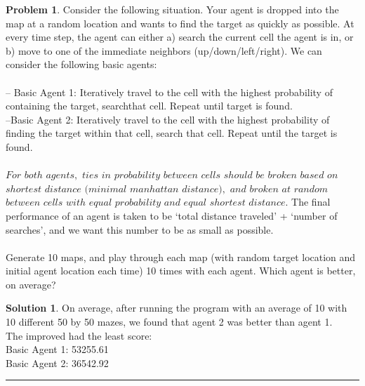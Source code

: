 \documentclass{article}
\theoremstyle{definition}
\newtheorem{problem}{Problem}
\def\fline{\rule{0.75\linewidth}{0.5pt}}
\newcommand{\finishline}{\vspace{-15pt}\begin{center}\fline\end{center}}
\newtheorem*{solution*}{Solution}
\newenvironment{solution}{\begin{solution*}}{{\finishline} \end{solution*}}
\begin{document}
\begin{problem}
Consider the following situation.  Your agent is dropped into the map at a random location and wants to find the target as quickly as possible.  At every time step, the agent can either a) search the current cell the agent is in, or b) move to one of the immediate neighbors (up/down/left/right).  We can consider the following basic agents:
\\\\
 – Basic Agent 1:  Iteratively travel to the cell with the highest probability of containing the target, searchthat cell.  Repeat until target is found.
 \\
 –Basic Agent 2:  Iteratively travel to the cell with the highest probability of finding the target within that cell, search that cell.  Repeat until the target is found.
 \\\\
 $For$ $both$ $agents,$ $ties$ $in$ $probability$ $between$ $cells$ $should$ $be$ $broken$ $based$ $on$ $shortest$ $distance$ $(minimal$ $manhattan$ $distance),$  $and$  $broken$  $at$  $random$  $between$  $cells$  $with$  $equal$  $probability$  $and$  $equal$  $shortest$  $distance.$
 The  final performance  of  an  agent  is  taken  to  be  ‘total  distance  traveled’  +  ‘number  of  searches’,  and  we  want  this number to be as small as possible.
 \\\\
 Generate 10 maps, and play through each map (with random target location and initial agent location each time) 10 times with each agent.  Which agent is better, on average?
\end{problem}
\smallskip
\begin{solution}
On average, after running the program with an average of 10 with 10 different 50 by 50 mazes, we found that agent 2 was better than agent 1. \\
The improved had the least score:\\
Basic Agent 1: 53255.61\\
Basic Agent 2: 36542.92\\
\end{solution}

\smallskip
\end{document}
